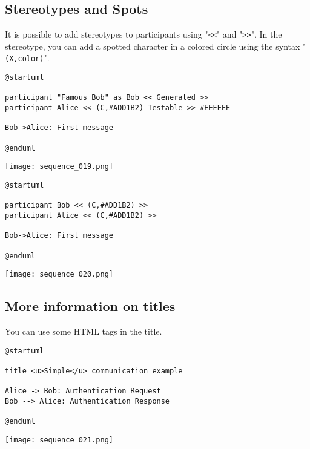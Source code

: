 \newpage \subsection{Stereotypes and Spots}

It is possible to add stereotypes to participants using "\texttt{<<}" and
"\texttt{>>}". In the stereotype, you can add a spotted character in a colored
circle using the syntax "\texttt{(X,color)}".

\begin{lstlisting}
@startuml

participant "Famous Bob" as Bob << Generated >>
participant Alice << (C,#ADD1B2) Testable >> #EEEEEE

Bob->Alice: First message

@enduml
\end{lstlisting}
\begin{center}
\texttt{[image: sequence\_019.png]}
\end{center}
		

\begin{lstlisting}
@startuml

participant Bob << (C,#ADD1B2) >>
participant Alice << (C,#ADD1B2) >>

Bob->Alice: First message

@enduml
\end{lstlisting}
\begin{center}
\texttt{[image: sequence\_020.png]}
\end{center}

		
\newpage \subsection{More information on titles}

You can use some HTML tags in the title.
\begin{lstlisting}
@startuml

title <u>Simple</u> communication example

Alice -> Bob: Authentication Request
Bob --> Alice: Authentication Response

@enduml
\end{lstlisting}
\begin{center}
\texttt{[image: sequence\_021.png]}
\end{center}

